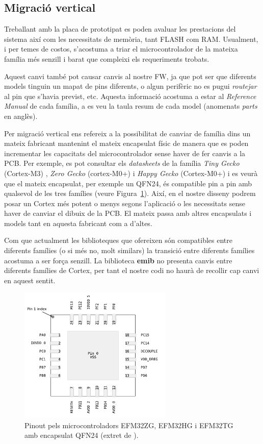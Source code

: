 \subsection{Migració vertical}
Treballant amb la placa de prototipat es poden avaluar les prestacions del sistema així com les necessitats de memòria, tant \gls{FLASH} com \gls{RAM}. Usualment, i per temes de costos, s'acostuma a triar el microcontrolador de la mateixa família més senzill i barat que compleixi els requeriments trobats.

Aquest canvi també pot causar canvis al nostre \gls{FW}, ja que pot ser que diferents models tinguin un mapat de pins diferents, o algun perifèric no es pugui {\em routejar} al pin que s'havia previst, etc. Aquesta informació acostuma a estar al {\em Reference Manual} de cada família, a \cite[8]{EFM32TGRM} es veu la taula resum de cada model (anomenats {\em parts} en anglès).

Per migració vertical ens refereix a la possibilitat de canviar de família dins un mateix fabricant mantenint el mateix encapsulat físic de manera que es poden incrementar les capacitats del microcontrolador sense haver de fer canvis a la \gls{PCB}.
Per exemple, es pot consultar els {\em datasheets} de la família {\em Tiny Gecko} (Cortex-M3) \cite[72]{EFM32TGDS}, {\em Zero Gecko} (cortex-M0+) \cite[66]{EFM32ZGDS} i {\em Happy Gecko} (Cortex-M0+)\cite[76]{EFM32HGDS} i es veurà que el mateix encapsulat, per exemple un QFN24, és compatible pin a pin amb qualsevol de les tres famílies (veure Figura~\ref{fig:pinout}). Així, en el nostre disseny podrem posar un Cortex més potent o menys segons l'aplicació o les necessitats sense haver de canviar el dibuix de la PCB. El mateix passa amb altres encapsulats i models tant en aquesta fabricant com a d'altes.

Com que actualment les biblioteques que ofereixen són compatibles entre diferents famílies (o si més no, molt similars) la transició entre diferents famílies acostuma a ser força senzill. La biblioteca {\bf emib} no presenta canvis entre diferents famílies de Cortex, per tant el nostre codi no haurà de recollir cap canvi en aquest sentit.

\begin{figure}[b]
 \centering
 \includegraphics[width=0.65\textwidth, keepaspectratio]{imatges/pinout.png}
 \caption{Pinout pels microcontroladors EFM32ZG, EFM32HG i EFM32TG amb encapsulat QFN24 (extret de \cite[72]{EFM32TGDS}).}
 \label{fig:pinout}
\end{figure}


